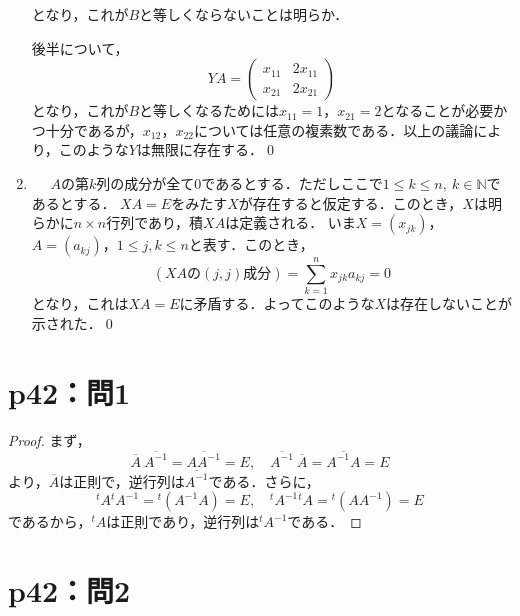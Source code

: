 \documentclass[a4paper,10pt,fleqn]{ltjsarticle}
\begin{document}
\begin{tleftbar}
\begin{enumerate}
\[          \]
          となり，これが$B$と等しくならないことは明らか．\par
          後半について，
          \[
            YA =\begin{pmatrix} x_{11} & 2 x_{11} \\  x_{21}&  2x_{21} \end{pmatrix}
          \]
          となり，これが$B$と等しくなるためには$x_{11}=1$，$x_{21}=2$となることが必要かつ十分であるが，$x_{12}$，$x_{22}$については任意の複素数である．以上の議論により，このような$Y$は無限に存在する．\qed
    \item  \mbox{　}
          $A$の第$k$列の成分が全て$0$であるとする．ただしここで$ 1 \le k \le n,~ k \in \mathbb{N}$であるとする．
          $XA=E$をみたす$X$が存在すると仮定する．このとき，$X$は明らかに$n \times n$行列であり，積$XA$は定義される．
          いま$X=(x_{jk})$，$A=(a_{kj})$，$ 1 \le j ,k \le n$と表す．このとき，
          \[
            (XA \text{の}(j,j)\text{成分}) = \sum_{k=1}^{n} x_{jk} a_{kj} =0
          \]
          となり，これは$XA =E$に矛盾する．よってこのような$X$は存在しないことが示された．\qed
  \end{enumerate}
\end{tleftbar}


\section*{p42：問1}

\begin{leftbar}
  \begin{proof}
    まず，
    \[
      \overline{A} \ \overline{A^{-1}} = \overline{A A^{-1}}=E,\quad \overline{A^{-1}} \ \overline{A} =\overline{A^{-1} A}=E
    \]
    より，$\overline{A}$は正則で，逆行列は$\overline{A^{-1}}$である．さらに，
    \[
      {}^t A {}^t A^{-1} ={}^t (A^{-1} A)=E,\quad {}^t A^{-1} {}^t A = {}^t (A A^{-1})=E
    \]
    であるから，${}^t A$は正則であり，逆行列は${}^t A^{-1}$である．
  \end{proof}
\end{leftbar}

\section*{p42：問2}
\end{document}
